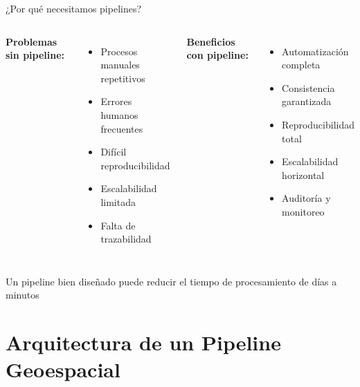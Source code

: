 \documentclass[10pt,aspectratio=169]{beamer}
\newcommand{\alertbox}[1]{
\begin{tcolorbox}[colframe=red!70,colback=red!5]
\centering\faExclamationTriangle\space #1
\end{tcolorbox}
}
\begin{document}
\begin{frame}{¿Por qué necesitamos pipelines?}
    \begin{columns}[T]
        \textbf{Problemas sin pipeline:}
        \begin{itemize}
            \item[\faTimesCircle] Procesos manuales repetitivos
            \item[\faTimesCircle] Errores humanos frecuentes
            \item[\faTimesCircle] Difícil reproducibilidad
            \item[\faTimesCircle] Escalabilidad limitada
            \item[\faTimesCircle] Falta de trazabilidad
        \end{itemize}
        
        \textbf{Beneficios con pipeline:}
        \begin{itemize}
            \item[\faCheckCircle] Automatización completa
            \item[\faCheckCircle] Consistencia garantizada
            \item[\faCheckCircle] Reproducibilidad total
            \item[\faCheckCircle] Escalabilidad horizontal
            \item[\faCheckCircle] Auditoría y monitoreo
        \end{itemize}
    \end{columns}
    
    \vspace{0.5cm}
    \alertbox{Un pipeline bien diseñado puede reducir el tiempo de procesamiento de días a minutos}
\end{frame}

\section{Arquitectura de un Pipeline Geoespacial}
\end{document}
